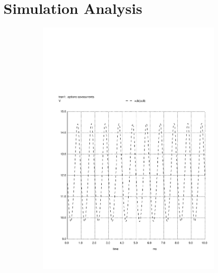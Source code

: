 \section{Simulation Analysis}
\label{sec:simulation}


\begin{figure}[h]
  \centering
  \begin{subfigure}{0.23\textwidth}
    \includegraphics[width=\linewidth, clip]{vo1.pdf}
    \label{fig:output1}
  \end{subfigure}
  \begin{subfigure}{0.23\textwidth}

\end{subfigure}
\end{figure}
